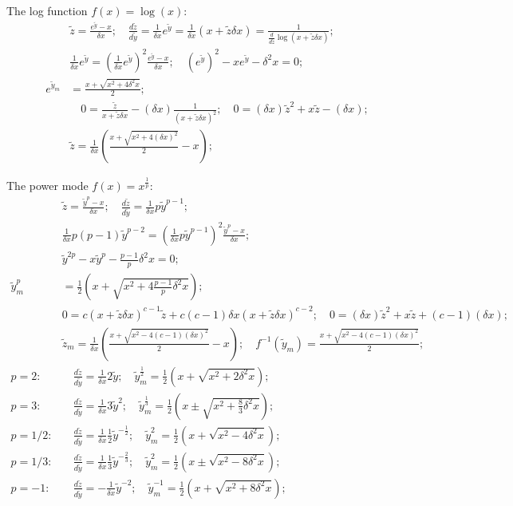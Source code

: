 \documentclass[twoside]{article}
\numberwithin{equation}{section}
\begin{document}
The log function $f(x) = \log(x)$:
\begin{align*}
& \tilde{z} = \frac{e^{\tilde{y}} - x}{\delta x}; \quad 
\frac{d \tilde{z}}{d \tilde{y}} = \frac{1}{\delta x} e^{\tilde{y}} = \frac{1}{\delta x} (x + \tilde{z} \delta x)
 = \frac{1}{\frac{d}{d \tilde{z}} \log(x + \tilde{z} \delta x)}; \\
& \frac{1}{\delta x} e^{\tilde{y}} = (\frac{1}{\delta x} e^{\tilde{y}})^2 \frac{e^{\tilde{y}} - x}{\delta x}; \quad 
(e^{\tilde{y}})^2 - x e^{\tilde{y}} - \delta^2 x = 0; \\
e^{\tilde{y}_m} &= \frac{x + \sqrt{x^2 + 4 \delta^2 x}}{2}; \\
& \quad 0 = \frac{\tilde{z}}{x + \tilde{z} \delta x} - (\delta x) \frac{1}{(x + \tilde{z} \delta x)^2}; \quad
0 = (\delta x) \tilde{z}^2 + x \tilde{z} - (\delta x); \\
& \tilde{z} = \frac{1}{\delta x}(\frac{x + \sqrt{x^2 + 4 (\delta x)^2}}{2} - x);
\end{align*}

The power mode $f(x) = x^{\frac{1}{p}}$:
\begin{align*}
& \tilde{z} = \frac{\tilde{y}^p - x}{\delta x}; \quad 
\frac{d \tilde{z}}{d \tilde{y}} = \frac{1}{\delta x} p \tilde{y}^{p-1}; \\
& \frac{1}{\delta x} p (p - 1) \tilde{y}^{p-2} = (\frac{1}{\delta x} p \tilde{y}^{p-1})^2 \frac{\tilde{y}^p - x}{\delta x}; \\
& \tilde{y}^{2p} - x \tilde{y}^{p} - \frac{p - 1}{p} \delta^2 x = 0; \\
\tilde{y}_m^p &= \frac{1}{2} (x + \sqrt{x^2 + 4 \frac{p - 1}{p} \delta^2 x}); \\
& 0 = c (x + \tilde{z} \delta x)^{c-1} \tilde{z} + c (c-1) \delta x (x + \tilde{z} \delta x)^{c-2}; \quad
0 = (\delta x) \tilde{z}^2 + x \tilde{z} + (c - 1) (\delta x); \\
& \tilde{z}_m = \frac{1}{\delta x}(\frac{x + \sqrt{x^2 - 4(c-1)(\delta x)^2}}{2} - x); \quad 
f^{-1}(\tilde{y}_m) = \frac{x + \sqrt{x^2 - 4(c-1)(\delta x)^2}}{2}; \\
p = 2:& \quad \frac{d \tilde{z}}{d \tilde{y}} = \frac{1}{\delta x} 2 \tilde{y}; \quad 
  \tilde{y}_m^{\frac{1}{2}} = \frac{1}{2} \left( x + \sqrt{x^2 + 2 \delta^2 x} \right); \\
p = 3:& \quad \frac{d \tilde{z}}{d \tilde{y}} = \frac{1}{\delta x} 3 \tilde{y}^2; \quad  
  \tilde{y}_m^{\frac{1}{3}} = \frac{1}{2} \left( x \pm \sqrt{x^2 + \frac{8}{3} \delta^2 x} \right); \\
p = 1/2:& \quad \frac{d \tilde{z}}{d \tilde{y}} = \frac{1}{\delta x} \frac{1}{2} \tilde{y}^{-\frac{1}{2}}; \quad 
  \tilde{y}_m^2 = \frac{1}{2} \left( x + \sqrt{x^2 - 4 \delta^2 x} \right); \\
p = 1/3:& \quad \frac{d \tilde{z}}{d \tilde{y}} = \frac{1}{\delta x} \frac{1}{3} \tilde{y}^{-\frac{2}{3}}; \quad
  \tilde{y}_m^2 = \frac{1}{2} \left( x \pm \sqrt{x^2 - 8 \delta^2 x} \right); \\
p = -1:& \quad \frac{d \tilde{z}}{d \tilde{y}} = - \frac{1}{\delta x} \tilde{y}^{-2}; \quad 
  \tilde{y}_m^{-1} = \frac{1}{2} \left( x + \sqrt{x^2 + 8 \delta^2 x} \right); 
\end{align*}
\end{document}
